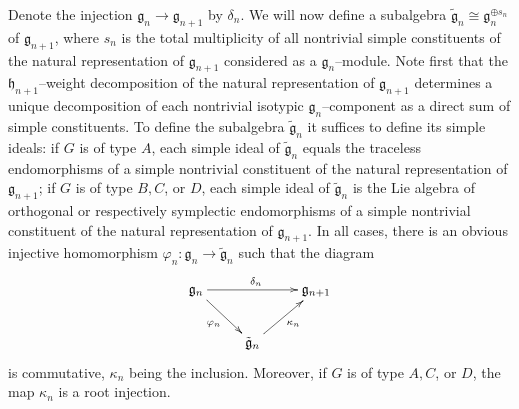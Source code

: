 \documentclass[12pt]{amsart}
\def\gg{\mathfrak{g}}
\def\gh{\mathfrak{h}}
\theoremstyle{remark}
\begin{document}
Denote the injection $\gg_n \to \gg_{n+1}$ by $\delta_n$. 
We will now define a subalgebra 
$\widetilde{\gg}_{n} \cong \gg_n^{\oplus s_{n}}$
of $\gg_{n+1}$, where $s_{n}$ is the 
total multiplicity of all  nontrivial simple constituents of the natural representation of $\gg_{n+1}$
considered as a $\gg_n$--module. 
Note first that the $\gh_{n+1}$--weight decomposition of the natural representation of $\gg_{n+1}$ determines a 
unique decomposition of each nontrivial isotypic $\gg_n$--component 
as a direct sum of simple constituents. To define the subalgebra $\tilde{\gg}_{n}$ it suffices to define its simple ideals:
if $G$ is of type $A$, each simple ideal of $\tilde{\gg}_{n}$ equals the traceless endomorphisms of a simple 
nontrivial constituent of the natural representation of $\gg_{n+1}$; if $G$ is of type $B, C$, or $D$, each simple ideal of 
$\tilde{\gg}_{n}$ is the Lie algebra of orthogonal or respectively symplectic endomorphisms of a simple nontrivial constituent
 of the natural representation of $\gg_{n+1}$. In all cases, there is an obvious injective homomorphism 
$\varphi_{n}: \gg_n \to \tilde{\gg}_{n}$ such that the diagram 
\begin{equation} \label{eq12}
\xymatrix{
\gg_n  \ar[rr]^{\delta_{n}} \ar[dr]_{\varphi_{n}}  & &\gg_{n+1} \\
& \tilde{\gg}_{n}
\ar[ur]_{\kappa_{n}} &}
\end{equation}
is commutative, $\kappa_{n}$ being the inclusion. Moreover,
if $G$ is of type $A, C$, or $D$, the map $\kappa_{n}$ is a root injection. 
\end{document}
